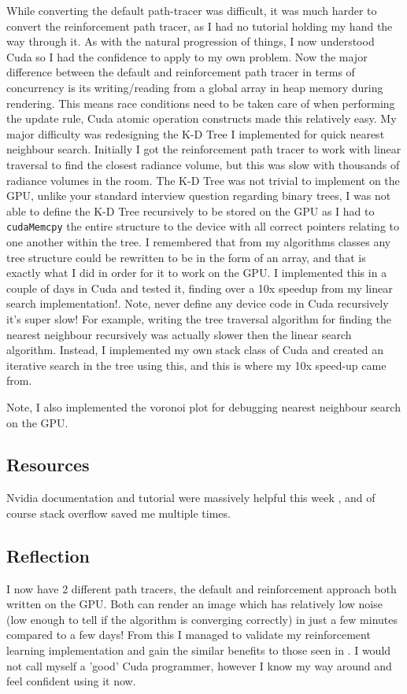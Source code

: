 \documentclass[conference]{IEEEtran}
\begin{document}
While converting the default path-tracer was difficult, it was much harder to convert the reinforcement path tracer, as I had no tutorial holding my hand the way through it. As with the natural progression of things, I now understood Cuda so I had the confidence to apply to my own problem. Now the major difference between the default and reinforcement path tracer in terms of concurrency is its writing/reading from a global array in heap memory during rendering. This means race conditions need to be taken care of when performing the update rule, Cuda atomic operation constructs made this relatively easy. My major difficulty was redesigning the K-D Tree I implemented for quick nearest neighbour search. Initially I got the reinforcement path tracer to work with linear traversal to find the closest radiance volume, but this was slow with thousands of radiance volumes in the room. The K-D Tree was not trivial to implement on the GPU, unlike your standard interview question regarding binary trees, I was not able to define the K-D Tree recursively to be stored on the GPU as I had to \verb|cudaMemcpy| the entire structure to the device with all correct pointers relating to one another within the tree. I remembered that from my algorithms classes any tree structure could be rewritten to be in the form of an array, and that is exactly what I did in order for it to work on the GPU. I implemented this in a couple of days in Cuda and tested it, finding over a 10x speedup from my linear search implementation!. Note, never define any device code in Cuda recursively it's super slow! For example, writing the tree traversal algorithm for finding the nearest neighbour recursively was actually slower then the linear search algorithm. Instead, I implemented my own stack class of Cuda and created an iterative search in the tree using this, and this is where my 10x speed-up came from.

Note, I also implemented the voronoi plot for debugging nearest neighbour search on the GPU.

\subsection{Resources}
Nvidia documentation and tutorial were massively helpful this week \cite{cuda-intro} \cite{cuda-programming}, and of course stack overflow saved me multiple times.

\subsection{Reflection}
I now have 2 different path tracers, the default and reinforcement approach both written on the GPU. Both can render an image which has relatively low noise (low enough to tell if the algorithm is converging correctly) in just a few minutes compared to a few days! From this I managed to validate my reinforcement learning implementation and gain the similar benefits to those seen in \cite{dahm2017learning}. I would not call myself a 'good' Cuda programmer, however I know my way around and feel confident using it now.
\end{document}
